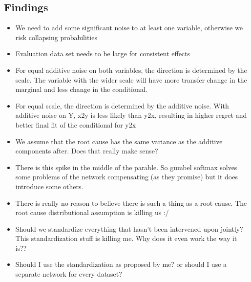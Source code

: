 \documentclass{article}
\begin{document}
\subsection{Findings}
\begin{itemize}
    \item We need to add some significant noise to at least one variable, otherwise we risk collapsing probabilities
    \item Evaluation data set needs to be large for consistent effects
    \item For equal additive noise on both variables, the direction is determined by the scale. The variable with the wider scale will have more transfer change in the marginal and less change in the conditional.
    \item For equal scale, the direction is determined by the additive noise. With additive noise on Y, x2y is less likely than y2x, resulting in higher regret and better final fit of the conditional for y2x
    \item We assume that the root cause has the same variance as the additive components after. Does that really make sense?
    \item There is this spike in the middle of the parable. So gumbel softmax solves some problems of the network compensating (as they promise) but it does introduce some others.
    \item There is really no reason to believe there is such a thing as a root cause. The root cause distributional assumption is killing us :/
    \item Should we standardize everything that hasn't been intervened upon jointly? This standardization stuff is killing me. Why does it even work the way it is??
    \item Should I use the standardization as proposed by me? or should I use a separate network for every dataset?
\end{itemize}
\end{document}
